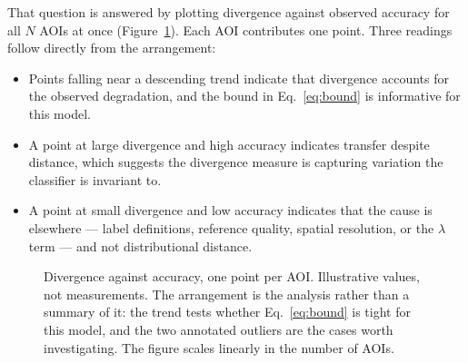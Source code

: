 \documentclass[11pt,a4paper]{article}
\begin{document}
That question is answered by plotting divergence against observed accuracy for
all $N$ AOIs at once (Figure~\ref{fig:scatter}). Each AOI contributes one
point. Three readings follow directly from the arrangement:

\begin{itemize}
\item Points falling near a descending trend indicate that divergence accounts
      for the observed degradation, and the bound in Eq.~\eqref{eq:bound} is
      informative for this model.
\item A point at large divergence and high accuracy indicates transfer despite
      distance, which suggests the divergence measure is capturing variation
      the classifier is invariant to.
\item A point at small divergence and low accuracy indicates that the cause is
      elsewhere --- label definitions, reference quality, spatial resolution,
      or the $\lambda$ term --- and not distributional distance.
\end{itemize}

\begin{figure}[t]
\centering
{}
\caption{Divergence against accuracy, one point per AOI. Illustrative values,
not measurements. The arrangement is the analysis rather than a summary of it:
the trend tests whether Eq.~\eqref{eq:bound} is tight for this model, and the
two annotated outliers are the cases worth investigating. The figure scales
linearly in the number of AOIs.}
\label{fig:scatter}
\end{figure}
\end{document}
